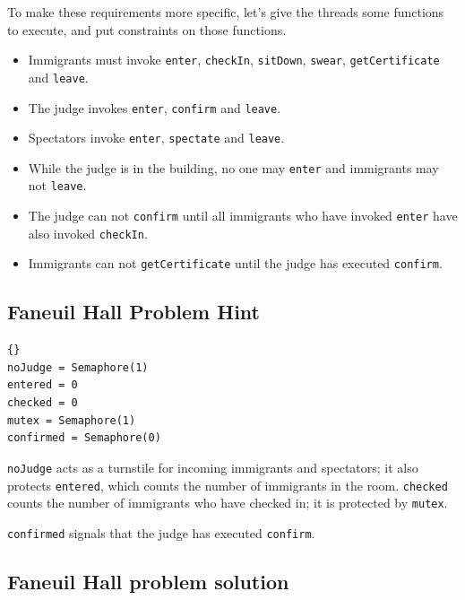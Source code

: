 \documentclass{book}
\newcommand{\clearemptydoublepage}{\newpage\cleardoublepage}
\begin{document}
To make these requirements more specific, let's give the threads
some functions to execute, and put constraints on those functions.

\begin{itemize}

\item Immigrants must invoke {\tt enter}, {\tt checkIn}, {\tt sitDown},
{\tt swear}, {\tt getCertificate} and {\tt leave}.

\item The judge invokes {\tt enter}, {\tt confirm} and {\tt leave}.

\item Spectators invoke {\tt enter}, {\tt spectate} and {\tt leave}.

\item While the judge is in the building, no one may {\tt enter}
and immigrants may not {\tt leave}.

\item The judge can not {\tt confirm} until all immigrants who have
invoked {\tt enter} have also invoked {\tt checkIn}.

\item Immigrants can not {\tt getCertificate} until the judge
has executed {\tt confirm}.

\end{itemize}

\clearemptydoublepage
\subsection {Faneuil Hall Problem Hint}

\begin{latin}
\begin{lstlisting}[title={Faneuil Hall problem hint}]{}
noJudge = Semaphore(1)
entered = 0
checked = 0
mutex = Semaphore(1)
confirmed = Semaphore(0)
\end{lstlisting}
\end{latin}

{\tt noJudge} acts as a turnstile for incoming immigrants and
spectators; it also protects {\tt entered}, which counts the
number of immigrants in the room.  {\tt checked} counts the
number of immigrants who have checked in; it is protected by
{\tt mutex}.

{\tt confirmed} signals that the judge has executed {\tt confirm}.


\clearemptydoublepage
\subsection {Faneuil Hall problem solution}
\end{document}
